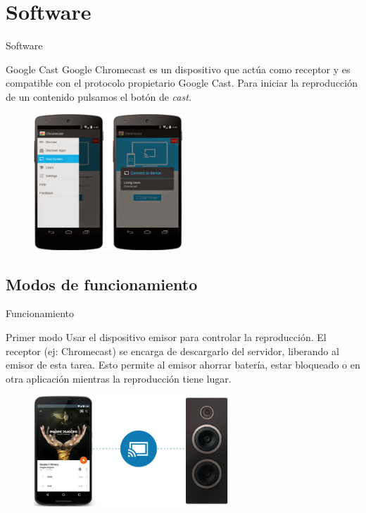 \section{Software}

\begin{frame}{Software}
	\begin{block}{Google Cast}
		Google Chromecast es un dispositivo que actúa como receptor y es compatible con el protocolo propietario Google Cast.
		Para iniciar la reproducción de un contenido pulsamos el botón de \textit{cast}.
	\end{block}

	\begin{figure}[h]
		\centering
		\includegraphics[width=0.5\textwidth]{./Imagenes/chromecast-mirroring.jpg}
	\end{figure}
\end{frame}



\subsection{Modos de funcionamiento}

\begin{frame}{Funcionamiento}
	\begin{block}{Primer modo}
		Usar el dispositivo emisor para controlar la reproducción. El receptor (ej: Chromecast) se encarga de descargarlo del servidor, liberando al emisor de esta tarea. 
		Esto permite al emisor ahorrar batería, estar bloqueado o en otra aplicación mientras la reproducción tiene lugar.
	\end{block}

	\begin{figure}[h]
		\includegraphics[width=0.65\textwidth]{./Imagenes/cast-speaker.jpg}
	\end{figure}
\end{frame}	
	
